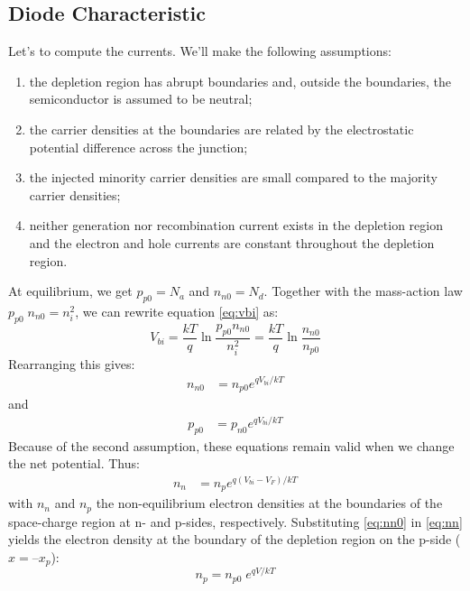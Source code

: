 \subsection{Diode Characteristic}
Let's to compute the currents. We'll make the following assumptions:
\begin{enumerate}
    \item the depletion region has abrupt boundaries and, outside the boundaries, the semiconductor is assumed to be neutral; 
    \item the carrier densities at the boundaries are related by the electrostatic potential difference across the junction; 
    \item the injected minority carrier densities are small compared to the majority carrier densities;
    \item neither generation nor recombination current exists in the depletion region and the electron and hole currents are constant throughout the depletion region.
\end{enumerate}
At equilibrium, we get $p_{p0} = N_a$ and $n_{n0} = N_d$. Together with the mass-action law $p_{p0} \; n_{n0} = n_i^2$, we can rewrite equation \ref{eq:vbi} as:
$$
V_{bi} = \frac{kT}{q} \ln \frac{p_{p0} n_{n0}}{n_i^2} = \frac{kT}{q} \ln \frac{n_{n0}}{n_{p0}}
$$
Rearranging this gives:
\begin{equation}
    \begin{split}
        n_{n0} &= n_{p0} e^{qV_{bi}/kT}
    \end{split}
    \label{eq:nn0}
\end{equation}
and
\begin{equation}
	\begin{split}
		p_{p0} &= p_{n0} e^{qV_{bi}/kT}
	\end{split}
	\label{eq:pp0}
\end{equation}
Because of the second assumption, these equations remain valid when we change the net potential. Thus:
\begin{equation}
    \begin{split}
        n_{n} &= n_{p} e^{q(V_{bi}-V_F)/kT}
    \end{split}
    \label{eq:nn}
\end{equation}
with $n_n$ and $n_p$ the non-equilibrium electron densities at the boundaries of the space-charge region at n- and p-sides, respectively. Substituting \ref{eq:nn0} in \ref{eq:nn} yields the electron density at the boundary of the depletion region on the p-side ($x = –x_p$): 
\begin{equation}
	n_p = n_{p0}\;e^{qV/kT}
\end{equation}
